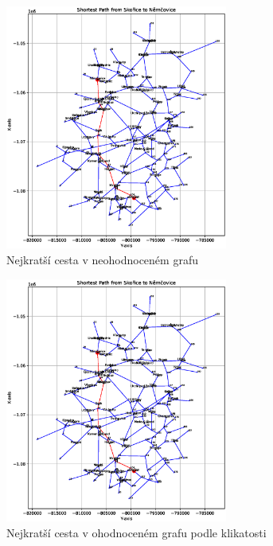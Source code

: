 \begin{figure}[H]
    \centering
    \includegraphics[width=0.65\textwidth]{images/Figure_1.eps}
    \caption{Nejkratší cesta v neohodnoceném grafu}
\end{figure}
\begin{figure}[H]
    \centering
    \includegraphics[width=0.65\textwidth]{images/Figure_1_curvature.eps}
    \caption{Nejkratší cesta v ohodnoceném grafu podle klikatosti}
\end{figure}
